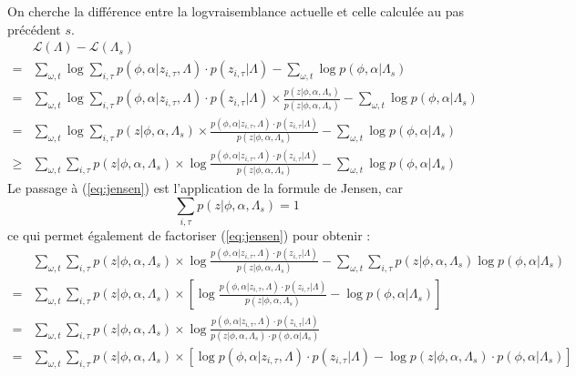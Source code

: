 \documentclass[a4paper,12pt]{article}
\begin{document}
On cherche la différence entre la logvraisemblance actuelle et celle calculée au pas précédent $s$.
\begin{align}
& \mathcal{L}(\Lambda) - \mathcal{L}(\Lambda_s) & \nonumber \\
= & \displaystyle\sum_{\omega,t} \log \displaystyle\sum_{i, \tau} p(\phi, \alpha | z_{i, \tau}, \Lambda) \cdot p(z_{i, \tau} | \Lambda) - \displaystyle\sum_{\omega,t} \log p(\phi, \alpha | \Lambda_s) \nonumber\\
= & \displaystyle\sum_{\omega,t} \log \displaystyle\sum_{i, \tau} p(\phi, \alpha | z_{i, \tau}, \Lambda) \cdot p(z_{i, \tau} | \Lambda) \times \frac{p(z|\phi,\alpha,\Lambda_s)}{p(z|\phi,\alpha,\Lambda_s)}- \displaystyle\sum_{\omega,t} \log p(\phi, \alpha | \Lambda_s) \nonumber\\
= & \displaystyle\sum_{\omega,t} \log \displaystyle\sum_{i, \tau} p(z|\phi,\alpha,\Lambda_s) \times \frac{p(\phi, \alpha | z_{i, \tau}, \Lambda) \cdot p(z_{i, \tau} | \Lambda)}{p(z|\phi,\alpha,\Lambda_s)}- \displaystyle\sum_{\omega,t} \log p(\phi, \alpha | \Lambda_s) \nonumber\\
\geq & \displaystyle\sum_{\omega,t} \displaystyle\sum_{i, \tau} p(z|\phi,\alpha,\Lambda_s) \times \log \frac{p(\phi, \alpha | z_{i, \tau}, \Lambda) \cdot p(z_{i, \tau} | \Lambda)}{p(z|\phi,\alpha,\Lambda_s)}- \displaystyle\sum_{\omega,t} \log p(\phi, \alpha | \Lambda_s) \label{eq:jensen}
\end{align}
Le passage à (\ref{eq:jensen}) est l'application de la formule de Jensen, car
\begin{equation*}
\displaystyle \sum_{i,\tau} p(z|\phi,\alpha,\Lambda_s) = 1
\end{equation*}
ce qui permet également de factoriser (\ref{eq:jensen}) pour obtenir :
\begin{align}
& \displaystyle\sum_{\omega,t} \displaystyle\sum_{i, \tau} p(z|\phi,\alpha,\Lambda_s) \times \log \frac{p(\phi, \alpha | z_{i, \tau}, \Lambda) \cdot p(z_{i, \tau} | \Lambda)}{p(z|\phi,\alpha,\Lambda_s)}- \displaystyle\sum_{\omega,t}\displaystyle\sum_{i, \tau} p(z|\phi,\alpha,\Lambda_s) \log p(\phi, \alpha | \Lambda_s) \nonumber \\
= & \displaystyle\sum_{\omega,t} \displaystyle\sum_{i, \tau} p(z|\phi,\alpha,\Lambda_s) \times [ \log \frac{p(\phi, \alpha | z_{i, \tau}, \Lambda) \cdot p(z_{i, \tau} | \Lambda)}{p(z|\phi,\alpha,\Lambda_s)}-\log p(\phi, \alpha | \Lambda_s) ] \nonumber \\
= & \displaystyle\sum_{\omega,t} \displaystyle\sum_{i, \tau} p(z|\phi,\alpha,\Lambda_s) \times \log \frac{p(\phi, \alpha | z_{i, \tau}, \Lambda) \cdot p(z_{i, \tau} | \Lambda)}{p(z|\phi,\alpha,\Lambda_s) \cdot p(\phi, \alpha | \Lambda_s)}  \label{avantk} \\
= & \displaystyle\sum_{\omega,t} \displaystyle\sum_{i, \tau} p(z|\phi,\alpha,\Lambda_s) \times [\log p(\phi, \alpha | z_{i, \tau}, \Lambda) \cdot p(z_{i, \tau} | \Lambda) - \log p(z|\phi,\alpha,\Lambda_s) \cdot p(\phi, \alpha | \Lambda_s)] \nonumber
\end{align}
\end{document}
